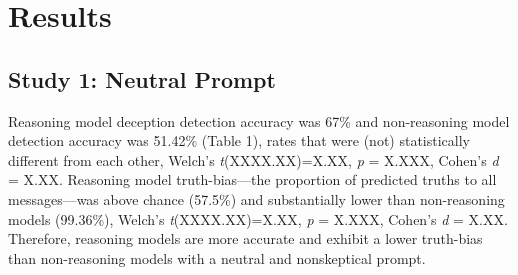 \documentclass{article}
\begin{document}






\section{Results}


\subsection{Study 1: Neutral Prompt}

Reasoning model deception detection accuracy was 67\% and non-reasoning model detection accuracy was 51.42\% (Table 1), rates that were (not) statistically different from each other, Welch's \textit{t}(XXXX.XX)=X.XX, \textit{p} = X.XXX, Cohen's \textit{d} = X.XX. Reasoning model truth-bias---the proportion of predicted truths to all messages---was above chance (57.5\%) and substantially lower than non-reasoning models (99.36\%), Welch's \textit{t}(XXXX.XX)=X.XX, \textit{p} = X.XXX, Cohen's \textit{d} = X.XX. Therefore, reasoning models are more accurate and exhibit a lower truth-bias than non-reasoning models with a neutral and nonskeptical prompt.
\end{document}
